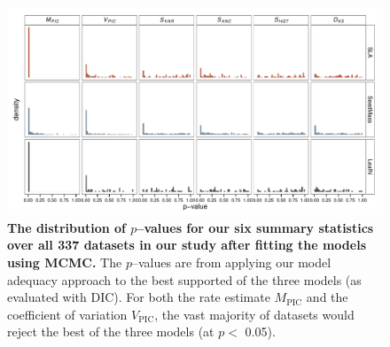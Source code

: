 \documentclass[a4paper,12pt]{article}
\begin{document}
\begin{figure}[p]
  \centering
  \includegraphics[angle=90, origin=c, scale=0.85]{figs/pval-hist-bayes}
  \caption{\textbf{The distribution of $p$--values for our six summary statistics over all 337 datasets in our study after fitting the models using MCMC.} The $p$--values are from applying our model adequacy approach to the best supported of the three models (as evaluated with DIC). For both the rate estimate $M_{\text{PIC}}$ and the coefficient of variation $V_{\text{PIC}}$, the vast majority of datasets would reject the best of the three models (at $p<$ 0.05).}
  \label{fig:supp-pvalues}
\end{figure}
\end{document}
